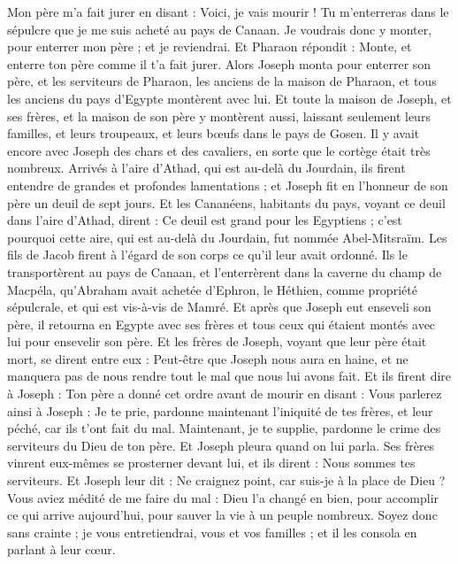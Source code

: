 \begin{multicols}{2}
Mon père m’a fait jurer en disant : Voici, je vais mourir ! Tu m’enterreras dans le sépulcre que je me suis acheté au pays de Canaan. Je voudrais donc y monter, pour enterrer mon père ; et je reviendrai.
Et Pharaon répondit : Monte, et enterre ton père comme il t'a fait jurer.
Alors Joseph monta pour enterrer son père, et les serviteurs de Pharaon, les anciens de la maison de Pharaon, et tous les anciens du pays d'Egypte montèrent avec lui.
Et toute la maison de Joseph, et ses frères, et la maison de son père y montèrent aussi, laissant seulement leurs familles, et leurs troupeaux, et leurs bœufs dans le pays de Gosen.
Il y avait encore avec Joseph des chars et des cavaliers, en sorte que le cortège était très nombreux.
Arrivés à l’aire d’Athad, qui est au-delà du Jourdain, ils firent entendre de grandes et profondes lamentations ; et Joseph fit en l’honneur de son père un deuil de sept jours.
Et les Cananéens, habitants du pays, voyant ce deuil dans l'aire d'Athad, dirent : Ce deuil est grand pour les Egyptiens ; c'est pourquoi cette aire, qui est au-delà du Jourdain, fut nommée Abel-Mitsraïm.
Les fils de Jacob firent à l'égard de son corps ce qu'il leur avait ordonné.
Ils le transportèrent au pays de Canaan, et l’enterrèrent dans la caverne du champ de Macpéla, qu’Abraham avait achetée d’Ephron, le Héthien, comme propriété sépulcrale, et qui est vis-à-vis de Mamré.
Et après que Joseph eut enseveli son père, il retourna en Egypte avec ses frères et tous ceux qui étaient montés avec lui pour ensevelir son père.
Et les frères de Joseph, voyant que leur père était mort, se dirent entre eux : Peut-être que Joseph nous aura en haine, et ne manquera pas de nous rendre tout le mal que nous lui avons fait.
Et ils firent dire à Joseph : Ton père a donné cet ordre avant de mourir en disant :
Vous parlerez ainsi à Joseph : Je te prie, pardonne maintenant l'iniquité de tes frères, et leur péché, car ils t'ont fait du mal. Maintenant, je te supplie, pardonne le crime des serviteurs du Dieu de ton père. Et Joseph pleura quand on lui parla.
Ses frères vinrent eux-mêmes se prosterner devant lui, et ils dirent : Nous sommes tes serviteurs.
Et Joseph leur dit : Ne craignez point, car suis-je à la place de Dieu ?
Vous aviez médité de me faire du mal : Dieu l’a changé en bien, pour accomplir ce qui arrive aujourd’hui, pour sauver la vie à un peuple nombreux.
Soyez donc sans crainte ; je vous entretiendrai, vous et vos familles ; et il les consola en parlant à leur cœur.

\end{multicols}
